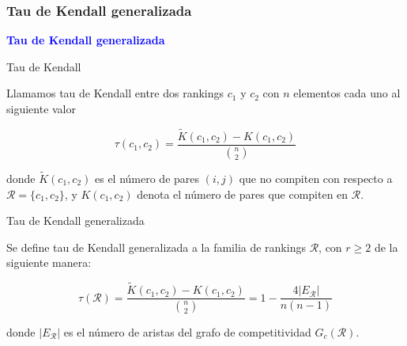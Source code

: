 \documentclass[10pt]{beamer}
\begin{document}
	\subsubsection{Tau de Kendall generalizada}
	
	\begin{frame}
		\begin{center}
			\Huge\textbf{\textsf{\textcolor{blue}{Tau de Kendall generalizada}}}
		\end{center}
	\end{frame}
	
	\begin{frame}{Tau de Kendall}
		\begin{defi}
			Llamamos tau de Kendall entre dos rankings $c_1$ y $c_2$ con $n$ elementos cada uno al siguiente valor
			
			\begin{equation}
			\tau(c_1, c_2) = \dfrac{\tilde{K}(c_1, c_2) - K(c_1, c_2)}{\binom{n}{2}}
			\end{equation} 
			
			donde $\tilde{K}(c_1, c_2)$ es el número de pares $(i,j)$ que no compiten con respecto a $\mathcal{R} = \{c_1, c_2\}$, y $K(c_1, c_2)$ denota el número de pares que compiten en $\mathcal{R}$.
		\end{defi}
	\end{frame}
	
	\begin{frame}{Tau de Kendall generalizada}
		\begin{defi}
			Se define tau de Kendall generalizada a la familia de rankings $\mathcal{R}$, con $r \geq 2$ de la siguiente manera:
			
			\begin{equation}
			\tau(\mathcal{R}) = \dfrac{\tilde{K}(c_1, c_2) - K(c_1, c_2)}{\binom{n}{2}} = 1 - \dfrac{4 |E_\mathcal{R}|}{n(n-1)}
			\end{equation}
			
			donde $|E_\mathcal{R}|$ es el número de aristas del grafo de competitividad $G_c(\mathcal{R})$.
		\end{defi}
		
	\end{frame}
	
\end{document}
